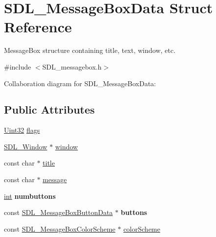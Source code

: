 \hypertarget{struct_s_d_l___message_box_data}{}\section{S\+D\+L\+\_\+\+Message\+Box\+Data Struct Reference}
\label{struct_s_d_l___message_box_data}


Message\+Box structure containing title, text, window, etc.  




{\ttfamily \#include $<$S\+D\+L\+\_\+messagebox.\+h$>$}



Collaboration diagram for S\+D\+L\+\_\+\+Message\+Box\+Data\+:
\subsection*{Public Attributes}
\begin{DoxyCompactItemize}
\item 
\hyperlink{_s_d_l__stdinc_8h_add440eff171ea5f55cb00c4a9ab8672d}{Uint32} \hyperlink{struct_s_d_l___message_box_data_a113d016f760bf4e4156b0f376358d6a0}{flags}
\item 
\hyperlink{_s_d_l__video_8h_a55a196c7d3b8497538632c79ae1e6392}{S\+D\+L\+\_\+\+Window} $\ast$ \hyperlink{struct_s_d_l___message_box_data_a5c333bc93705c66068e140bc28daedcb}{window}
\item 
const char $\ast$ \hyperlink{struct_s_d_l___message_box_data_a93ceeafeed20b553ad4c86c9be37f117}{title}
\item 
const char $\ast$ \hyperlink{struct_s_d_l___message_box_data_ada6ae208a1f85adabbd7a7a08ca609c8}{message}
\item 
\hypertarget{struct_s_d_l___message_box_data_a133f4fef549cc0cb14b799af35f3dc5a}{}\hyperlink{_s_d_l__thread_8h_a6a64f9be4433e4de6e2f2f548cf3c08e}{int} {\bfseries numbuttons}\label{struct_s_d_l___message_box_data_a133f4fef549cc0cb14b799af35f3dc5a}

\item 
\hypertarget{struct_s_d_l___message_box_data_a265e47aab749e384661ae91d3e11e0db}{}const \hyperlink{struct_s_d_l___message_box_button_data}{S\+D\+L\+\_\+\+Message\+Box\+Button\+Data} $\ast$ {\bfseries buttons}\label{struct_s_d_l___message_box_data_a265e47aab749e384661ae91d3e11e0db}

\item 
const \hyperlink{struct_s_d_l___message_box_color_scheme}{S\+D\+L\+\_\+\+Message\+Box\+Color\+Scheme} $\ast$ \hyperlink{struct_s_d_l___message_box_data_a18744865a3e89e260db5f01aee579e35}{color\+Scheme}
\end{DoxyCompactItemize}


